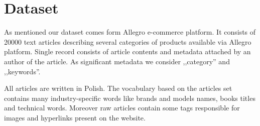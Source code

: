 \documentclass[twoside,twocolumn]{article}
\begin{document}
	\section{Dataset}
	
	As mentioned our dataset comes form Allegro e-commerce platform. It consists of 20000 text articles describing several categories of products available via Allegro platform. Single record consists of article contents and metadata attached by an author of the article. As significant metadata we consider ,,category'' and ,,keywords''.
	
	
	All articles are written in Polish. The vocabulary based on the articles set contains many industry-specific words like brands and models names, books titles and technical words. Moreover raw articles contain some tags responsible for images and hyperlinks present on the website.
	
\end{document}
